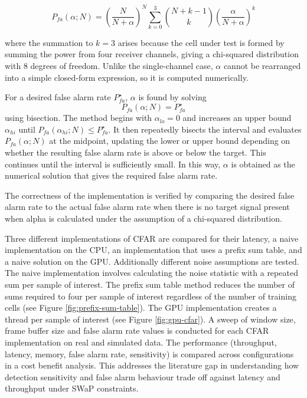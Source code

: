 \begin{equation}
    P_{fa}(\alpha;N) = \left( \frac{N}{N+\alpha} \right)^N
    \sum_{k=0}^{3} \binom{N+k-1}{k}
    \left( \frac{\alpha}{N+\alpha} \right)^k
\end{equation}

where the summation to $k=3$ arises because the cell under test is formed by summing the power from four receiver channels, giving a chi-squared distribution with 8 degrees of freedom. Unlike the single-channel case, $\alpha$ cannot be rearranged into a simple closed-form expression, so it is computed numerically.

For a desired false alarm rate $P_{fa}^{\star}$, $\alpha$ is found by solving
\begin{equation}
    P_{fa}(\alpha;N) = P_{fa}^{\star}
\end{equation}
using bisection. The method begins with $\alpha_{lo}=0$ and increases an upper bound $\alpha_{hi}$ until $P_{fa}(\alpha_{hi};N) \leq P_{fa}^{\star}$. It then repeatedly bisects the interval and evaluates $P_{fa}(\alpha;N)$ at the midpoint, updating the lower or upper bound depending on whether the resulting false alarm rate is above or below the target. This continues until the interval is sufficiently small. In this way, $\alpha$ is obtained as the numerical solution that gives the required false alarm rate.

The correctness of the implementation is verified by comparing the desired false alarm rate to the actual false alarm rate when there is no target signal present when alpha is calculated under the assumption of a chi-squared distribution.

Three different implementations of CFAR are compared for their latency, a naive implementation on the CPU, an implementation that uses a prefix sum table, and a naive solution on the GPU. Additionally different noise assumptions are tested. The naive implementation involves calculating the noise statistic with a repeated sum per sample of interest. The prefix sum table method reduces the number of sums required to four per sample of interest regardless of the number of training cells (see Figure \ref{fig:prefix-sum-table}). The GPU implementation creates a thread per sample of interest (see Figure \ref{fig:gpu-cfar}). A sweep of window size, frame buffer size and false alarm rate values is conducted for each CFAR implementation on real and simulated data. The performance (throughput, latency, memory, false alarm rate, sensitivity) is compared across configurations in a cost benefit analysis. This addresses the literature gap in understanding how detection sensitivity and false alarm behaviour trade off against latency and throughput under SWaP constraints.

